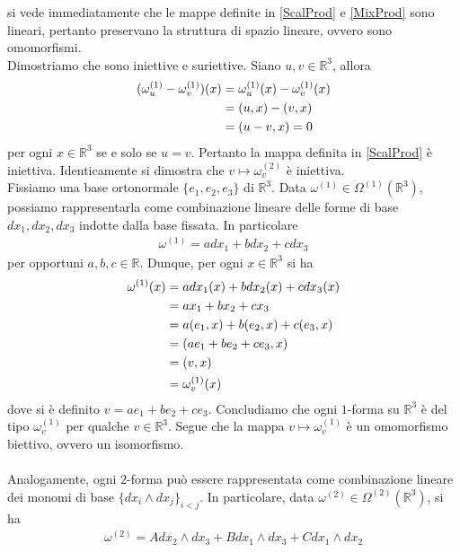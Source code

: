 \documentclass[oneside, 11pt]{amsbook}
\makeatletter
\newcommand{\0}{{(0)}}
\newcommand{\3}{{(3)}}
\theoremstyle{colonplain}
\theoremstyle{colondefinition}
\theoremstyle{colonremark}
\numberwithin{equation}{chapter}
\renewcommand{\proofname}{Dimostrazione}
\renewenvironment{proof}[1][\proofname]{\par
  \pushQED{\qed}%
  \normalfont \topsep6\p@\@plus6\p@\relax
  \trivlist
  \item[\hskip\labelsep\bfseries #1:]\ignorespaces
}{%
  \popQED\endtrivlist\@endpefalse
}
\makeatother
\begin{document}
\begin{proof} si vede immediatamente che le mappe definite in \eqref{ScalProd} e \eqref{MixProd} sono lineari, pertanto preservano la struttura di spazio lineare, ovvero sono omomorfismi. \\
Dimostriamo che sono iniettive e suriettive. Siano $u, v \in \mathbb{R}^3$, allora 
\begin{align}
    (\omega^{(1)}_u - \omega^{(1)}_v)(x) &= \omega^{(1)}_u(x) - \omega^{(1)}_v(x) \notag \\
    &= (u, x) - (v, x) \notag \\
    &= (u - v, x) = 0 \notag
\end{align}
per ogni $x \in \mathbb{R}^3$ se e solo se $u = v$. Pertanto la mappa definita in \eqref{ScalProd} è iniettiva. Identicamente si dimostra che $v \mapsto \omega^{(2)}_v$ è iniettiva. \\
Fissiamo una base ortonormale $\{e_1, e_2, e_3\}$ di $\mathbb{R}^3$. Data $\omega^{(1)} \in \Omega^{(1)}(\mathbb{R}^3)$, possiamo rappresentarla come combinazione lineare delle forme di base $dx_1, dx_2, dx_3$ indotte dalla base fissata. In particolare 
\begin{align}
    \omega^{(1)} = adx_1 + bdx_2 + cdx_3
\end{align}
per opportuni $a, b, c \in \mathbb{R}$. Dunque, per ogni $x \in \mathbb{R}^3$ si ha
\begin{align}
    \omega^{(1)}(x) &= adx_1(x) + bdx_2(x) + cdx_3(x) \notag \\
    &= ax_1 + bx_2 + cx_3 \notag \\
    &= a(e_1, x) + b(e_2, x) + c(e_3, x) \notag \\
    &= (ae_1 + be_2 + ce_3, x) \notag \\
    &= (v, x) \notag \\
    &= \omega^{(1)}_v(x)
\end{align}
dove si è definito $v = ae_1 + be_2 + ce_3$. Concludiamo che ogni $1$-forma su $\mathbb{R}^3$ è del tipo $\omega^{(1)}_v$ per qualche $v \in \mathbb{R}^3$. Segue che la mappa $v \mapsto \omega^{(1)}_v$ è un omomorfismo biettivo, ovvero un isomorfismo. \\ \\
Analogamente, ogni $2$-forma può essere rappresentata come combinazione lineare dei monomi di base $\{dx_i \wedge dx_j\}_{i < j}$. In particolare, data $\omega^{(2)} \in \Omega^{(2)}(\mathbb{R}^3)$, si ha 
\begin{align}
    \omega^{(2)} = Adx_2 \wedge dx_3 + Bdx_1 \wedge dx_3 + Cdx_1 \wedge dx_2

\end{align}
\end{proof}
\end{document}
